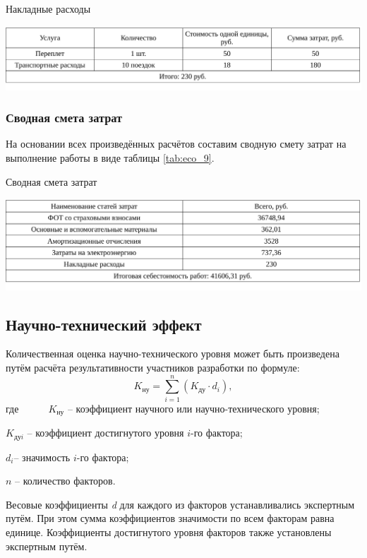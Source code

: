 \begin{table}[!ht]
\caption{Накладные расходы}
\centering
\includegraphics[page=1, width=1\linewidth]{tables/economics/econom_3.pdf}
\label{tab:eco_8}
\end{table}


\subsubsection{Сводная смета затрат}

На основании всех произведённых расчётов составим сводную смету затрат на выполнение работы в виде таблицы \ref{tab:eco_9}.

\begin{table}[!ht]
\caption{Сводная смета затрат}
\centering
\includegraphics[page=1, width=1\linewidth]{tables/economics/econom_4.pdf}
\label{tab:eco_9}
\end{table}


\subsection{Научно-технический эффект}
Количественная оценка научно-технического уровня может быть произведена путём расчёта результативности участников разработки по формуле:
$$K_{\textit{ну}} = \sum_{i=1}^{n}(K_{\textit{ду}}\cdot d_{i}),$$
где~~~~~\ $K_\textit{ну}$ – коэффициент научного или научно-технического уровня;

$K_\textit{дуi}$ – коэффициент достигнутого уровня $\textit{i}{}$-го фактора;

$d_{i}$– значимость $i$-го фактора;

$\textit{n}$ – количество факторов.

Весовые коэффициенты \textit{d} для каждого из факторов устанавливались экспертным путём. При этом сумма коэффициентов значимости по всем факторам равна единице. Коэффициенты достигнутого уровня факторов также установлены экспертным путём.

